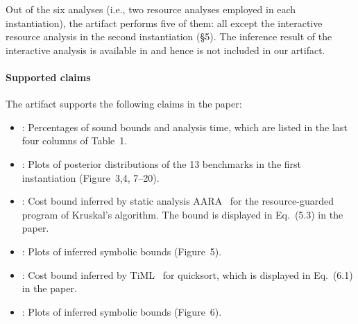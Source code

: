 Out of the six analyses (i.e., two resource analyses employed in each
instantiation), the artifact performs five of them: all except the interactive
resource analysis in the second instantiation (\S5).
%
The inference result of the interactive analysis is available in
\citet{Chargueraud2019} and hence is not included in our artifact.

\paragraph{Supported claims}

The artifact supports the following claims in the paper:
\begin{itemize}
      \item {}: Percentages of sound
            bounds and analysis time, which are listed in the last four columns
            of Table~1.
      \item {}: Plots of posterior
            distributions of the 13 benchmarks in the first instantiation
            (Figure~3,4, 7--20).
      \item {}: Cost bound inferred by
            static analysis AARA~\citep{Hoffmann2011a,Hoffmann2017} for the
            resource-guarded program of Kruskal's algorithm.
            The bound is displayed in Eq.~(5.3) in the paper.
      \item {}: Plots of inferred symbolic
            bounds (Figure~5).
      \item {}: Cost bound inferred by
            TiML~\citep{WangWC17} for quicksort, which is displayed in Eq.~(6.1)
            in the paper.
      \item {}: Plots of inferred symbolic
            bounds (Figure~6).
\end{itemize}

